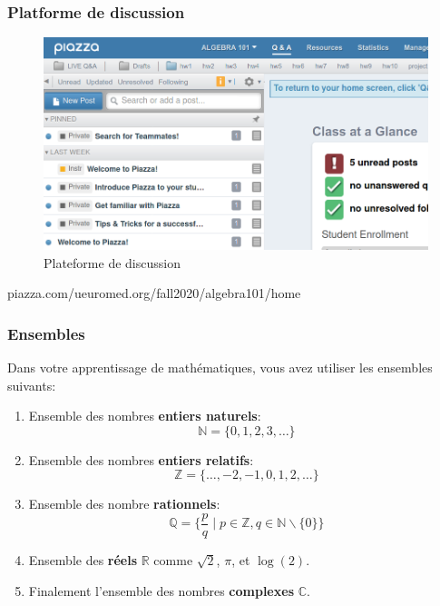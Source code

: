\documentclass{beamer}
\begin{document}
\begin{frame}[t]
  \frametitle{Platforme de discussion}
  \begin{figure}[htpb]
    \centering
    \includegraphics[width=0.8\linewidth]{./piazza.png}
    \caption{Plateforme de discussion}%
    \label{fig:./piazza}
  \end{figure} 
    \centering
    \Large
    \alert{piazza.com/ueuromed.org/fall2020/algebra101/home}
\end{frame}




\begin{frame}[t]
  \frametitle{Ensembles}
  {\small
     Dans votre apprentissage de mathématiques, vous avez utiliser les
      ensembles suivants:
    }

  \begin{enumerate}
    \item Ensemble des nombres \alert{\textbf{entiers naturels}}: $$\mathbb{N} =
      \{0,1,2,3,\ldots\}$$
    \item Ensemble des nombres \alert{\textbf{entiers relatifs}}: $$\mathbb{Z} =
      \{\ldots, -2, -1, 0, 1, 2, \ldots\}$$
    \item Ensemble des nombre \alert{\textbf{rationnels}}:
      $$
      \mathbb{Q} = \{\frac{p}{q}\;|\; p\in\mathbb{Z}, q\in
      \mathbb{N}\backslash\{0\}\}
      $$
    \item Ensemble des \alert{\textbf{réels}} $\mathbb{R}$ comme $\sqrt{2}$, $\pi$, et
      $\log(2)$.
    \item Finalement l'ensemble des nombres \alert{\textbf{complexes}}
      $\mathbb{C}$.
  \end{enumerate}
\end{frame}
\end{document}
